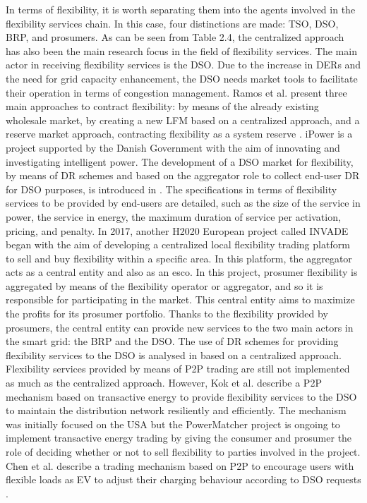 In terms of flexibility, it is worth separating them into the agents involved in the flexibility services chain. In this case, four distinctions are made: TSO, DSO, BRP, and prosumers. As can be seen from Table 2.4, the centralized approach has also been the main research focus in the field of flexibility services. 
The main actor in receiving flexibility services is the DSO. Due to the increase in DERs and the need for grid capacity enhancement, the DSO needs market tools to facilitate their operation in terms of congestion management. Ramos et al. present three main approaches to contract flexibility: by means of the already existing wholesale market, by creating a new LFM based on a centralized approach, and a reserve market approach, contracting flexibility as a system reserve \cite{ramos2016realizing}. iPower is a project supported by the Danish Government with the aim of innovating and investigating intelligent power. The development of a DSO market for flexibility, by means of DR schemes and based on the aggregator role to collect end-user DR for DSO purposes, is introduced in \cite{nordentoft2013development}. The specifications in terms of flexibility services to be provided by end-users are detailed, such as the size of the service in power, the service in energy, the maximum duration of service per activation, pricing, and penalty. In 2017, another H2020 European project called INVADE began \cite{Olivella2018} with the aim of developing a centralized local flexibility trading platform to sell and buy flexibility within a specific area.
In this platform, the aggregator acts as a central entity and also as an esco. In this project, prosumer flexibility is aggregated by means of the flexibility operator or aggregator, and so it is responsible for participating in the market. This central entity aims to maximize the profits for its prosumer portfolio. Thanks to the flexibility provided by prosumers, the central entity can provide new services to the two main actors in the smart grid: the BRP and the DSO. The use of DR schemes for providing flexibility services to the DSO is analysed in \cite{spiliotis2016demand, poudineh2014distributed} based on a centralized approach.
Flexibility services provided by means of P2P trading are still not implemented as much as the centralized approach. However, Kok et al. \cite{kok2016society} describe a P2P mechanism based on transactive energy to provide flexibility services to the DSO to maintain the distribution network resiliently and efficiently. The mechanism was initially focused on the USA but the PowerMatcher project is ongoing to implement transactive energy trading by giving the consumer and prosumer the role of deciding whether or not to sell flexibility to parties involved in the project. Chen et al. describe a trading mechanism based on P2P to encourage users with flexible loads as EV to adjust their charging behaviour according to DSO requests \cite{chen2017integrated}.


